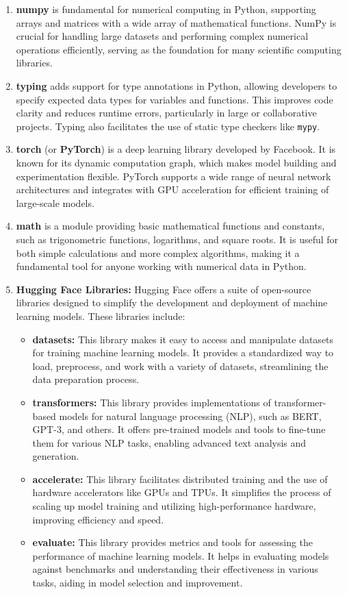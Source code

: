 \begin{enumerate}
    \item \textbf{numpy} is fundamental for numerical computing in Python, supporting arrays and matrices with a wide array of mathematical functions. NumPy is crucial for handling large datasets and performing complex numerical operations efficiently, serving as the foundation for many scientific computing libraries.
    
    \item \textbf{typing} adds support for type annotations in Python, allowing developers to specify expected data types for variables and functions. This improves code clarity and reduces runtime errors, particularly in large or collaborative projects. Typing also facilitates the use of static type checkers like \texttt{mypy}.
    
    \item \textbf{torch} (or \textbf{PyTorch}) is a deep learning library developed by Facebook. It is known for its dynamic computation graph, which makes model building and experimentation flexible. PyTorch supports a wide range of neural network architectures and integrates with GPU acceleration for efficient training of large-scale models.
    
    \item \textbf{math} is a module providing basic mathematical functions and constants, such as trigonometric functions, logarithms, and square roots. It is useful for both simple calculations and more complex algorithms, making it a fundamental tool for anyone working with numerical data in Python.
    
    \item \textbf{Hugging Face Libraries:} Hugging Face offers a suite of open-source libraries designed to simplify the development and deployment of machine learning models. These libraries include:
    \begin{itemize}
        \item \textbf{datasets:} This library makes it easy to access and manipulate datasets for training machine learning models. It provides a standardized way to load, preprocess, and work with a variety of datasets, streamlining the data preparation process.
        \item \textbf{transformers:} This library provides implementations of transformer-based models for natural language processing (NLP), such as BERT, GPT-3, and others. It offers pre-trained models and tools to fine-tune them for various NLP tasks, enabling advanced text analysis and generation.
        \item \textbf{accelerate:} This library facilitates distributed training and the use of hardware accelerators like GPUs and TPUs. It simplifies the process of scaling up model training and utilizing high-performance hardware, improving efficiency and speed.
        \item \textbf{evaluate:} This library provides metrics and tools for assessing the performance of machine learning models. It helps in evaluating models against benchmarks and understanding their effectiveness in various tasks, aiding in model selection and improvement.
    \end{itemize}
\end{enumerate}
